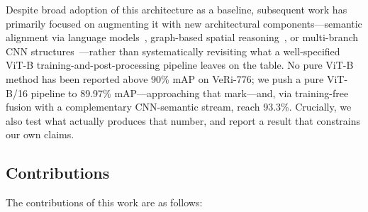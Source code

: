 \documentclass[10pt,a4paper]{article}
\begin{document}
Despite broad adoption of this architecture as a baseline, subsequent work has
primarily focused on augmenting it with new architectural
components---semantic alignment via language
models~\cite{li2023clipreid,lu2025clipsenet}, graph-based spatial
reasoning~\cite{shen2022hpgn}, or multi-branch CNN
structures~\cite{luo2023mbr4b}---rather than systematically revisiting what a
well-specified ViT-B training-and-post-processing pipeline leaves on the table.
No pure ViT-B method has been reported above 90\% mAP on VeRi-776; we push a
pure ViT-B/16 pipeline to 89.97\% mAP---approaching that mark---and, via
training-free fusion with a complementary CNN-semantic stream, reach 93.3\%.
Crucially, we also test what actually produces that number, and report a result
that constrains our own claims.

\subsection{Contributions}
The contributions of this work are as follows:
\end{document}
